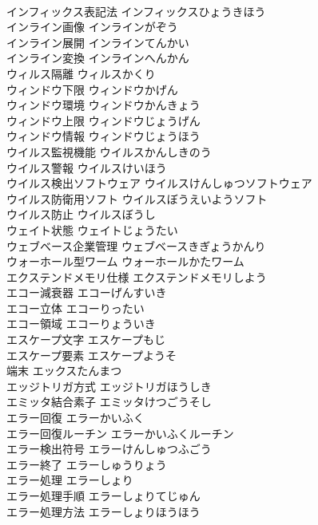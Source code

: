\documentclass[8pt]{extreport}
\begin{document}
\begin{CJK}{UTF8}{min}
\\	インフィックス表記法	インフィックスひょうきほう	
\\	インライン画像	インラインがぞう	
\\	インライン展開	インラインてんかい	
\\	インライン変換	インラインへんかん	
\\	ウィルス隔離	ウィルスかくり	
\\	ウィンドウ下限	ウィンドウかげん	
\\	ウィンドウ環境	ウィンドウかんきょう	
\\	ウィンドウ上限	ウィンドウじょうげん	
\\	ウィンドウ情報	ウィンドウじょうほう	
\\	ウイルス監視機能	ウイルスかんしきのう	
\\	ウイルス警報	ウイルスけいほう	
\\	ウイルス検出ソフトウェア	ウイルスけんしゅつソフトウェア	
\\	ウイルス防衛用ソフト	ウイルスぼうえいようソフト	
\\	ウイルス防止	ウイルスぼうし	
\\	ウェイト状態	ウェイトじょうたい	
\\	ウェブベース企業管理	ウェブベースきぎょうかんり	
\\	ウォーホール型ワーム	ウォーホールかたワーム	
\\	エクステンドメモリ仕様	エクステンドメモリしよう	
\\	エコー減衰器	エコーげんすいき	
\\	エコー立体	エコーりったい	
\\	エコー領域	エコーりょういき	
\\	エスケープ文字	エスケープもじ	
\\	エスケープ要素	エスケープようそ	
\\	端末	エックスたんまつ	
\\	エッジトリガ方式	エッジトリガほうしき	
\\	エミッタ結合素子	エミッタけつごうそし	
\\	エラー回復	エラーかいふく	
\\	エラー回復ルーチン	エラーかいふくルーチン	
\\	エラー検出符号	エラーけんしゅつふごう	
\\	エラー終了	エラーしゅうりょう	
\\	エラー処理	エラーしょり	
\\	エラー処理手順	エラーしょりてじゅん	
\\	エラー処理方法	エラーしょりほうほう	

\end{CJK}
\end{document}
